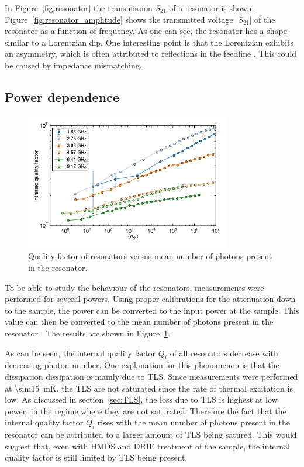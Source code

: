 \documentclass[12pt]{report}
\begin{document}
 In Figure~\ref{fig:resonator} the transmission $S_{21}$ of a resonator is shown. Figure~\ref{fig:resonator_amplitude} shows the transmitted voltage $|S_{21}|$ of the resonator as a function of frequency. As one can see, the resonator has a shape similar to a Lorentzian dip. One interesting point is that the Lorentzian exhibits an asymmetry, which is often attributed to reflections in the feedline \cite[p.~192]{Geerlings}. This could be caused by impedance mismatching.


\subsection{Power dependence}
\label{sec:resonator:results:power_dependence}

\begin{figure}
    \centering
    \includegraphics[width=0.8\textwidth]{Figures/Qi_vs_n_photon.png}
    \caption{Quality factor of resonators versus mean number of photons present in the resonator.}
    \label{fig:Qi_vs_n_photon}
\end{figure}

To be able to study the behaviour of the resonators, measurements were performed for several powers. Using proper calibrations for the attenuation down to the sample, the power can be converted to the input power at the sample. This value can then be converted to the mean number of photons present in the resonator \cite{DRIE}. The results are shown in Figure~\ref{fig:Qi_vs_n_photon}.

As can be seen, the internal quality factor $Q_i$ of all resonators decrease with decreasing photon number. One explanation for this phenomenon is that the dissipation dissipation is mainly due to TLS. Since measurements were performed at \SI{\sim15}{mK}, the TLS are not saturated since the rate of thermal excitation is low. As discussed in section~\ref{sec:TLS}, the loss due to TLS is highest at low power, in the regime where they are not saturated. Therefore the fact that the internal quality factor $Q_i$ rises with the mean number of photons present in the resonator can be attributed to a larger amount of TLS being satured. This would suggest that, even with HMDS and DRIE treatment of the sample, the internal quality factor is still limited by TLS being present.
\end{document}
